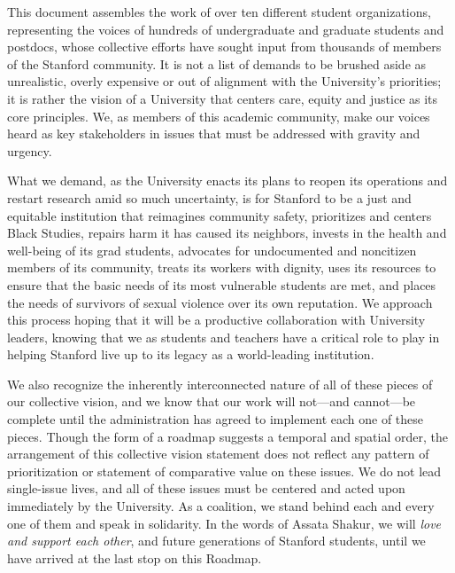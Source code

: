 \documentclass[12pt, titlepage, letterpaper]{article}
\begin{document}
This document assembles the work of over ten different student organizations, representing the voices of hundreds of undergraduate and graduate students and postdocs, whose collective efforts have sought input from thousands of members of the Stanford community. It is not a list of demands to be brushed aside as unrealistic, overly expensive or out of alignment with the University’s priorities; it is rather the vision of a University that centers care, equity and justice as its core principles. We, as members of this academic community, make our voices heard as key stakeholders in issues that must be addressed with gravity and urgency.

What we demand, as the University enacts its plans to reopen its operations and restart research amid so much uncertainty, is for Stanford to be a just and equitable institution that reimagines community safety, prioritizes and centers Black Studies, repairs harm it has caused its neighbors, invests in the health and well-being of its grad students, advocates for undocumented and noncitizen members of its community, treats its workers with dignity, uses its resources to ensure that the basic needs of its most vulnerable students are met, and places the needs of survivors of sexual violence over its own reputation. We approach this process hoping that it will be a productive collaboration with University leaders, knowing that we as students and teachers have a critical role to play in helping Stanford live up to its legacy as a world-leading institution. 

We also recognize the inherently interconnected nature of all of these pieces of our collective vision, and we know that our work will not---and cannot---be complete until the administration has agreed to implement each one of these pieces. Though the form of a roadmap suggests a temporal and spatial order, the arrangement of this collective vision statement does not reflect any pattern of prioritization or statement of comparative value on these issues. We do not lead single-issue lives, and all of these issues must be centered and acted upon immediately by the University. As a coalition, we stand behind  each and every one of them and speak in solidarity. In the words of Assata Shakur, we will \textit{love and support each other}, and future generations of Stanford students, until we have arrived at the last stop on this Roadmap.
\end{document}
